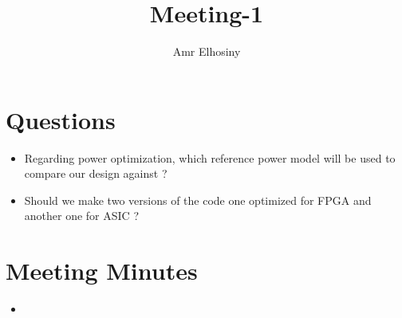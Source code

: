 \documentclass[11pt,a4paper]{article}
\author{Amr Elhosiny}
\begin{document}
\title{Meeting-1}

\maketitle

\section{Questions}
\begin{itemize}
	\item Regarding power optimization, which reference power model will be used to compare our design against ?
	\item Should we make two versions of the code one optimized for FPGA and another one for ASIC ?
\end{itemize}

\section{Meeting Minutes}
\begin{itemize}
	\item
\end{itemize}
\end{document}
